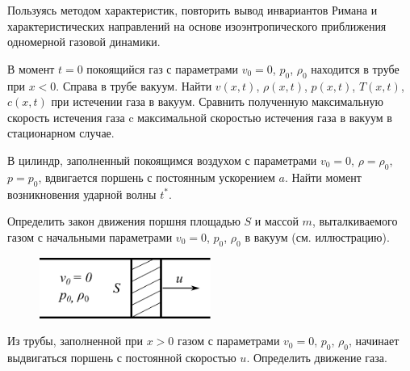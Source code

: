 \documentclass[a4paper, 14pt]{extarticle}
\begin{document}
\begin{problems}
	
	\item Пользуясь методом характеристик, повторить вывод инвариантов Римана и характеристических направлений на основе изоэнтропического приближения одномерной газовой динамики.
	
	\item
	В момент $t=0$  покоящийся газ с параметрами $v_0 = 0$, $p_0$, $\rho_0$ находится в трубе при $x<0$. Справа в трубе вакуум. Найти $v(x,t)$, $\rho(x,t)$, $p(x,t)$, $T(x,t)$, $c(x,t)$ при истечении газа в вакуум. Сравнить полученную максимальную скорость истечения газа c максимальной скоростью истечения газа в вакуум в стационарном случае.
	
	\item 
	В цилиндр, заполненный покоящимся воздухом с параметрами $v_0 = 0$, $\rho=\rho_0$, $p=p_0$, вдвигается поршень с постоянным ускорением $a$. Найти момент возникновения ударной волны $t^*$.
	
	\item
	Определить закон движения поршня площадью $S$ и массой $m$, выталкиваемого газом с начальными параметрами $v_0=0$, $p_0$, $\rho_0$ в вакуум (см. иллюстрацию).

	\begin{figure}[h!]
		\centering
		\includegraphics[width=0.5\textwidth]{../img/piston_u.pdf}
	\end{figure}
	
	\item 
	Из трубы, заполненной при $x>0$ газом с параметрами  $v_0=0$, $p_0$, $\rho_0$, начинает выдвигаться поршень с постоянной скоростью $u$. Определить движение газа.

\end{problems}
\end{document}
